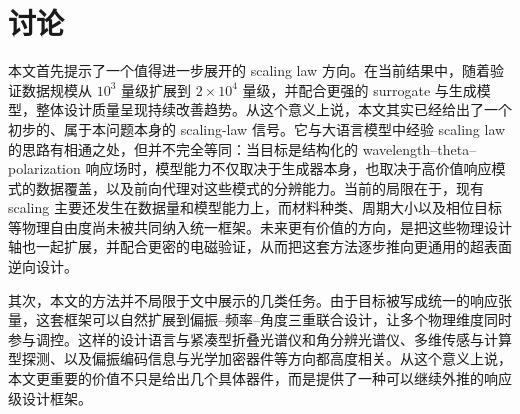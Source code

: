 \section{讨论}

本文首先提示了一个值得进一步展开的 scaling law 方向。在当前结果中，随着验证数据规模从 $10^3$ 量级扩展到 $2\times10^4$ 量级，并配合更强的 surrogate 与生成模型，整体设计质量呈现持续改善趋势。从这个意义上说，本文其实已经给出了一个初步的、属于本问题本身的 scaling-law 信号。它与大语言模型中经验 scaling law 的思路有相通之处，但并不完全等同\cite{kaplan2020scaling}：当目标是结构化的 wavelength--theta--polarization 响应场时，模型能力不仅取决于生成器本身，也取决于高价值响应模式的数据覆盖，以及前向代理对这些模式的分辨能力。当前的局限在于，现有 scaling 主要还发生在数据量和模型能力上，而材料种类、周期大小以及相位目标等物理自由度尚未被共同纳入统一框架。未来更有价值的方向，是把这些物理设计轴也一起扩展，并配合更密的电磁验证，从而把这套方法逐步推向更通用的超表面逆向设计。

其次，本文的方法并不局限于文中展示的几类任务。由于目标被写成统一的响应张量，这套框架可以自然扩展到偏振--频率--角度三重联合设计，让多个物理维度同时参与调控。这样的设计语言与紧凑型折叠光谱仪和角分辨光谱仪\cite{faraji2018folded,cai2024angleresolved}、多维传感与计算型探测\cite{jiang2024multidimensional}、以及偏振编码信息与光学加密器件\cite{guo2022stokes}等方向都高度相关。从这个意义上说，本文更重要的价值不只是给出几个具体器件，而是提供了一种可以继续外推的响应级设计框架。
